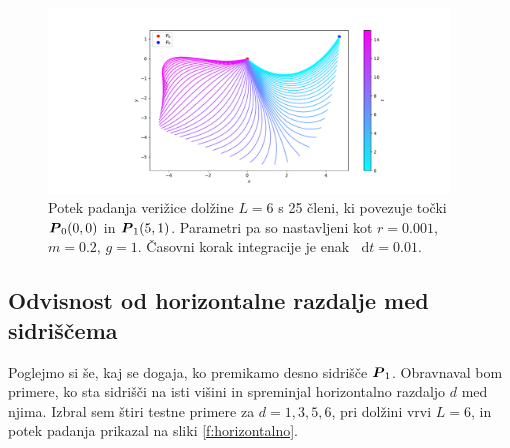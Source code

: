 \documentclass[a4paper, 12pt, slovene]{article}
\newcommand*\diff{\mathop{}\!\mathrm{d}}
\numberwithin{equation}{section}
\newcommand{\bi}[1]{\hbox{\boldmath{$#1$}}}
\begin{document}
\begin{figure}[H]
\centering
\includegraphics[width=0.95\textwidth]{grafi/falling_chain_P.5-1_L.6_n.25_t.15_r.0.001_m.0.2_g.1_dt.0.010006671114076937_freq.25.pdf}
\caption{Potek padanja verižice dolžine $L=6$ s 25 členi, ki povezuje točki ${\bi P_0}(0, 0)$ in ${\bi P_1}(5, 1)$. Parametri pa so nastavljeni kot $r=0.001$, $m=0.2$, $g=1$. Časovni korak integracije je enak $\diff t = 0.01$.}
\label{f:padanje-cat}
\end{figure}





\subsection{Odvisnost od horizontalne razdalje med sidriščema}
Poglejmo si še, kaj se dogaja, ko premikamo desno sidrišče ${\bi P_1}$. Obravnaval bom primere, ko sta sidrišči na isti višini in spreminjal horizontalno razdaljo $d$ med njima. Izbral sem štiri testne primere za $d=1, 3, 5, 6$, pri dolžini vrvi $L = 6$, in potek padanja prikazal na sliki \ref{f:horizontalno}.
\end{document}
